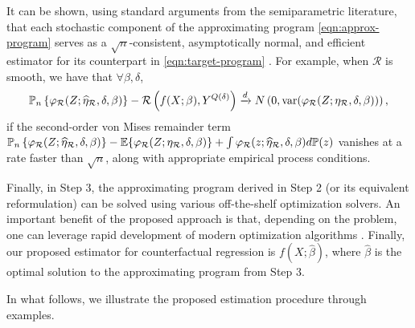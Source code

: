 It can be shown, using standard arguments from the semiparametric literature, that each stochastic component of the approximating program \eqref{eqn:approx-program} serves as a $\sqrt{n}$-consistent, asymptotically normal, and efficient estimator for its counterpart in \eqref{eqn:target-program} \citep[][Section 4]{kennedy2022semiparametric}. For example, when $\mathcal{R}$ is smooth, we have that $\forall \beta, \delta$,
\begin{align} \label{eqn:objective-root-n-CAN}
        \mathbb{P}_n\left\{ \varphi_{\mathcal{R}}(Z;\widehat{\eta}_{\mathcal{R}},\delta,\beta)\right\} - \mathcal{R}\left( f(X;\beta), Y^{Q(\delta)} \right) \xrightarrow[]{d} N\left(0, \text{var}(\varphi_{\mathcal{R}}(Z;\eta_{\mathcal{R}},\delta,\beta))\right),
\end{align}
if the second-order von Mises remainder term $\mathbb{P}_n\left\{ \varphi_{\mathcal{R}}(Z;\widehat{\eta}_{\mathcal{R}},\delta,\beta)\right\} - \mathbb{E}\{\varphi_{\mathcal{R}}(Z;\eta_{\mathcal{R}},\delta,\beta)\} + \int \varphi_{\mathcal{R}}(z;\widehat{\eta}_{\mathcal{R}},\delta,\beta) d\mathbb{P}(z)$ vanishes at a rate faster than $\sqrt{n}$, along with appropriate empirical process conditions. %

Finally, in Step 3, the approximating program derived in Step 2 (or its equivalent reformulation) can be solved using various off-the-shelf optimization solvers. An important benefit of the proposed approach is that, depending on the problem, one can leverage rapid development of modern optimization algorithms \citep[e.g.,][]{boyd2011distributed,bertsekas2015convex, jain2017non}. Finally, our proposed estimator for counterfactual regression is $f(X;\widehat{\beta})$, where $\widehat{\beta}$ is the optimal solution to the approximating program from Step 3.

In what follows, we illustrate the proposed estimation procedure through examples.

